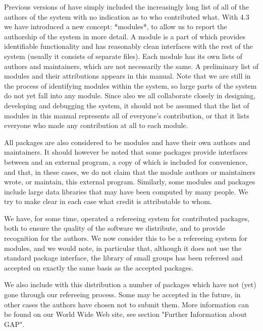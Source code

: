 
Previous versions of {\GAP} have simply included the increasingly long
list of all of the authors of the system with no indication as to who
contributed what. With {\GAP} 4.3 we have introduced a new concept:
*modules*, to allow us to report the authorship of the system in more
detail. A module is a part of {\GAP} which provides identifiable
functionality and has reasonably clean interfaces with the rest of the
system (usually it consists of separate files). Each module has its
own lists of authors and maintainers, which are not necessarily the
same. A preliminary list of modules and their attributions appears in
this manual. Note that we are still in the process of identifying
modules within the system, so large parts of the system do not yet
fall into any module. Since also we all collaborate closely in
designing, developing and debugging the system, it should not be
assumed that the list of modules in this manual represents all of
everyone's contribution, or that it lists everyone who made any
contribution at all to each module.

All {\GAP} packages are also considered to be modules and have their
own authors and maintainers. It should however be noted that some
packages provide interfaces between {\GAP} and an external program, a
copy of which is included for convenience, and that, in these cases,
we do not claim that the module authors or maintainers wrote, or
maintain, this external program. Similarly, some modules and packages
include large data libraries that may have been computed by many
people. We try to make clear in each case what credit is attributable
to whom.

We have, for some time, operated a refereeing system for contributed
packages, both to ensure the quality of the software we distribute,
and to provide recognition for the authors. We now consider this to be
a refereeing system for modules, and we would note, in particular
that, although it does not use the standard package interface, the
library of small groups has been refereed and accepted on exactly the
same basis as the accepted  packages.

We also include with this distribution a
number of packages which have not (yet) gone through our refereeing
process. Some may be accepted in the future, in other cases the
authors have chosen not to submit them.  More information can be found
on our World Wide Web site, see section "Further Information about
GAP".


